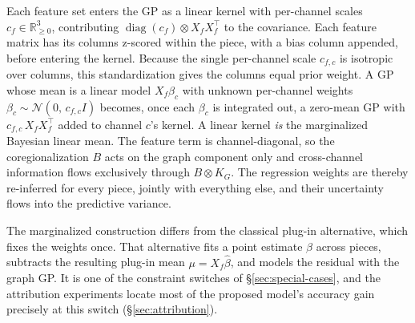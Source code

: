 \documentclass[11pt,a4paper]{report}
\newcommand{\R}{\mathbb{R}}
\newcommand{\N}{\mathcal{N}}
\newcommand{\diag}{\operatorname{diag}}
\begin{document}
Each feature set enters the GP as a linear kernel with per-channel scales
$c_f \in \R^{3}_{\ge 0}$, contributing $\diag(c_f) \otimes X_f X_f^\top$ to
the covariance. Each feature matrix has its columns z-scored within the
piece, with a bias column appended, before entering the kernel. Because the
single per-channel scale $c_{f,c}$ is isotropic over columns, this
standardization gives the columns equal prior weight. A GP whose mean is a linear model
$X_f \beta_c$ with unknown per-channel weights
$\beta_c \sim \N(0,\, c_{f,c} I)$ becomes, once each $\beta_c$ is integrated
out, a zero-mean GP with $c_{f,c}\, X_f X_f^\top$ added to channel $c$'s
kernel. A linear kernel \emph{is} the marginalized Bayesian linear mean. The
feature term is channel-diagonal, so the coregionalization $B$ acts on the
graph component only and cross-channel information flows exclusively through
$B \otimes K_G$. The regression weights are thereby re-inferred for every
piece, jointly with everything else, and their uncertainty flows into the
predictive variance.

The marginalized construction differs from the classical plug-in
alternative, which fixes the weights once. That alternative fits a point
estimate $\hat\beta$ across pieces, subtracts the resulting plug-in mean
$\mu = X_f \hat\beta$, and models the residual with the graph GP. It is one
of the constraint switches of \S\ref{sec:special-cases}, and the attribution
experiments locate most of the proposed model's accuracy gain precisely at
this switch (\S\ref{sec:attribution}).
\end{document}
